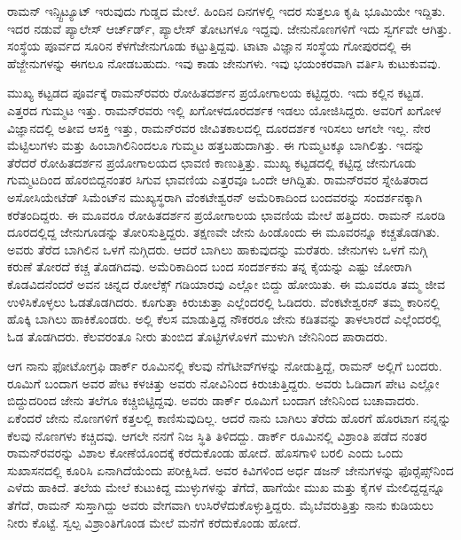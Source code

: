 
ರಾಮನ್ ಇನ್ಸ್ಟಿಟ್ಯೂಟ್ ಇರುವುದು ಗುಡ್ಡದ ಮೇಲೆ. ಹಿಂದಿನ ದಿನಗಳಲ್ಲಿ ಇದರ ಸುತ್ತಲೂ ಕೃಷಿ ಭೂಮಿಯೇ ಇದ್ದಿತು. ಇದರ ನಡುವೆ ಪ್ಯಾಲೇಸ್ ಆರ್ಚ್‌ರ್ಡ್, ಪ್ಯಾಲೇಸ್ ತೋಟಗಳೂ ಇದ್ದವು. ಜೇನುನೊಣಗಳಿಗೆ ಇದು ಸ್ವರ್ಗವೇ ಆಗಿತ್ತು. ಸಂಸ್ಥೆಯ ಪೂರ್ವದ ಸೂರಿನ ಕೆಳಗೆ\break ಜೇನುಗೂಡು ಕಟ್ಟುತ್ತಿದ್ದವು. ಟಾಟಾ ವಿಜ್ಞಾನ ಸಂಸ್ಥೆಯ ಗೋಪುರದಲ್ಲಿ ಈ ಹೆಜ್ಜೇನುಗಳನ್ನು ಈಗಲೂ ನೋಡಬಹುದು. ಇವು ಕಾಡು ಜೇನುಗಳು. ಇವು ಭಯಂಕರವಾಗಿ ವರ್ತಿಸಿ ಕುಟುಕುವವು.

ಮುಖ್ಯ ಕಟ್ಟಡದ ಪೂರ್ವಕ್ಕೆ ರಾಮನ್‍ರವರು ರೋಹಿತದರ್ಶನ ಪ್ರಯೋಗಾಲಯ ಕಟ್ಟಿದ್ದರು. ಇದು ಕಲ್ಲಿನ ಕಟ್ಟಡ. ಎತ್ತರದ ಗುಮ್ಮಟ ಇತ್ತು. ರಾಮನ್‍ರವರು ಇಲ್ಲಿ ಖಗೋಳದೂರದರ್ಶಕ ಇಡಲು ಯೋಜಿಸಿದ್ದರು. ಅವರಿಗೆ ಖಗೋಳ ವಿಜ್ಞಾನದಲ್ಲಿ ಅತೀವ ಆಸಕ್ತಿ ಇತ್ತು, ರಾಮನ್‍ರವರ ಜೀವಿತಕಾಲದಲ್ಲಿ ದೂರದರ್ಶಕ ಇರಿಸಲು ಆಗಲೇ ಇಲ್ಲ. ನೇರ ಮೆಟ್ಟಿಲುಗಳು ಮತ್ತು ಹಿಂಬಾಗಿಲಿನಿಂದಲೂ ಗುಮ್ಮಟ ಹತ್ತಬಹುದಾಗಿತ್ತು. ಈ ಗುಮ್ಮಟಕ್ಕೂ ಬಾಗಿಲಿತ್ತು. ಇದನ್ನು ತೆರೆದರೆ ರೋಹಿತದರ್ಶನ ಪ್ರಯೋಗಾಲಯದ ಛಾವಣಿ ಕಾಣುತ್ತಿತ್ತು. ಮುಖ್ಯ ಕಟ್ಟಡದಲ್ಲಿ ಕಟ್ಟಿದ್ದ ಜೇನುಗೂಡು ಗುಮ್ಮಟದಿಂದ ಹೊರಬಿದ್ದನಂತರ ಸಿಗುವ ಛಾವಣಿಯ ಎತ್ತರವೂ ಒಂದೇ ಆಗಿದ್ದಿತು. ರಾಮನ್‍ರವರ ಸ್ನೇಹಿತರಾದ ಅಸೋಸಿಯೇಟೆಡ್ ಸಿಮೆಂಟ್‍ನ ಮುಖ್ಯಸ್ಥರಾಗಿ ವೆಂಕಟೇಶ್ವರನ್ ಅಮೆರಿಕಾದಿಂದ ಬಂದವರನ್ನು ಸಂದರ್ಶನಕ್ಕಾಗಿ ಕರೆತಂದಿದ್ದರು. ಈ ಮೂವರೂ ರೋಹಿತದರ್ಶನ ಪ್ರಯೋಗಾಲಯ ಛಾವಣಿಯ ಮೇಲೆ ಹತ್ತಿದರು. ರಾಮನ್ ನೂರಡಿ ದೂರದಲ್ಲಿದ್ದ ಜೇನುಗೂಡನ್ನು ತೋರಿಸುತ್ತಿದ್ದರು. ತಕ್ಷಣವೇ ಜೇನು ಹಿಂಡೊಂದು ಈ ಮೂವರನ್ನೂ ಕಚ್ಚತೊಡಗಿತು. ಅವರು ತೆರೆದ ಬಾಗಿಲಿನ ಒಳಗೆ ನುಗ್ಗಿದರು. ಆದರೆ ಬಾಗಿಲು ಹಾಕುವುದನ್ನು ಮರೆತರು. ಜೇನುಗಳು ಒಳಗೆ ನುಗ್ಗಿ ಕರುಣೆ ತೋರದೆ ಕಚ್ಚ ತೊಡಗಿದವು. ಅಮೆರಿಕಾದಿಂದ ಬಂದ ಸಂದರ್ಶಕನು ತನ್ನ ಕೈಯನ್ನು ಎಷ್ಟು ಜೋರಾಗಿ ಕೊಡವಿದನೆಂದರೆ ಅವನ ಚಿನ್ನದ ರೋಲೆಕ್ಸ್ ಗಡಿಯಾರವು ಎಲ್ಲೋ ಬಿದ್ದು ಹೋಯಿತು. ಈ ಮೂವರೂ ತಮ್ಮ ಜೀವ ಉಳಿಸಿಕೊಳ್ಳಲು ಓಡತೊಡಗಿದರು. ಕೂಗುತ್ತಾ ಕಿರುಚುತ್ತಾ ಎಲ್ಲೆಂದರಲ್ಲಿ ಓಡಿದರು. ವೆಂಕಟೇಶ್ವರನ್ ತಮ್ಮ ಕಾರಿನಲ್ಲಿ ಹೊಕ್ಕಿ ಬಾಗಿಲು ಹಾಕಿಕೊಂಡರು. ಅಲ್ಲಿ ಕೆಲಸ ಮಾಡುತ್ತಿದ್ದ ನೌಕರರೂ ಜೇನು ಕಡಿತವನ್ನು ತಾಳಲಾರದೆ ಎಲ್ಲೆಂದರಲ್ಲಿ ಓಡ ತೊಡಗಿದರು. ಕೆಲವರಂತೂ ನೀರು ತುಂಬಿದ ತೊಟ್ಟಿಗಳೊಳಗೆ ಮುಳುಗಿ ಜೇನಿನಿಂದ ಪಾರಾದರು.

ಆಗ ನಾನು ಫೋಟೋಗ್ರಫಿ ಡಾರ್ಕ್ ರೂಮಿನಲ್ಲಿ ಕೆಲವು ನೆಗೆಟೀವ್‍ಗಳನ್ನು ನೋಡುತ್ತಿದ್ದೆ, ರಾಮನ್ ಅಲ್ಲಿಗೆ ಬಂದರು. ರೂಮಿಗೆ ಬಂದಾಗ ಅವರ ಪೇಟ ಕಳಚಿತ್ತು ಅವರು ನೋವಿನಿಂದ ಕಿರುಚುತ್ತಿದ್ದರು. ಅವರು ಓಡಿದಾಗ ಪೇಟ ಎಲ್ಲೋ ಬಿದ್ದುದರಿಂದ ಜೇನು ತಲೆಗೂ ಕಚ್ಚಿಬಿಟ್ಟಿದ್ದವು. ಅವರು ಡಾರ್ಕ್ ರೂಮಿಗೆ ಬಂದಾಗ ಜೇನಿನಿಂದ ಬಚಾವಾದರು. ಏಕೆಂದರೆ ಜೇನು ನೊಣಗಳಿಗೆ ಕತ್ತಲಲ್ಲಿ ಕಾಣಿಸುವುದಿಲ್ಲ. ಆದರೆ ನಾನು ಬಾಗಿಲು ತೆರೆದು ಹೊರಗೆ ಹೊರಟಾಗ ನನ್ನನ್ನು ಕೆಲವು ನೊಣಗಳು ಕಚ್ಚಿದವು. ಆಗಲೇ ನನಗೆ ನಿಜ ಸ್ಥಿತಿ ತಿಳಿದದ್ದು. ಡಾರ್ಕ್ ರೂಮಿನಲ್ಲಿ ವಿಶ್ರಾಂತಿ ಪಡೆದ ನಂತರ ರಾಮನ್‍ರವರನ್ನು ವಿಶಾಲ ಕೋಣೆಯೊಂದಕ್ಕೆ ಕರೆದುಕೊಂಡು ಹೋದೆ. ಹೊಸಗಾಳಿ ಬರಲಿ ಎಂದು ಒಂದು ಸುಖಾಸನದಲ್ಲಿ ಕೂರಿಸಿ ಏನಾಗಿದೆಯೆಂದು ಪರೀಕ್ಷಿಸಿದೆ. ಅವರ ಕಿವಿಗಳಿಂದ ಅರ್ಧ ಡಜನ್ ಜೇನುಗಳನ್ನು ಫೊರ್‍ಸೆಪ್ಸ್‌ನಿಂದ ಎಳೆದು ಹಾಕಿದೆ. ತಲೆಯ ಮೇಲೆ ಕುಟುಕಿದ್ದ ಮುಳ್ಳುಗಳನ್ನು ತೆಗೆದೆ, ಹಾಗೆಯೇ ಮುಖ ಮತ್ತು ಕೈಗಳ ಮೇಲಿದ್ದದ್ದನ್ನೂ ತೆಗೆದೆ, ರಾಮನ್ ಸುಸ್ತಾಗಿದ್ದು ಅವರು ವೇಗವಾಗಿ ಉಸಿರೆಳೆದುಕೊಳ್ಳುತ್ತಿದ್ದರು. ಮೈಬೆವರುತ್ತಿತ್ತು ನಾನು ಕುಡಿಯಲು ನೀರು ಕೊಟ್ಟೆ. ಸ್ವಲ್ಪ ವಿಶ್ರಾಂತಿಗೊಂಡ ಮೇಲೆ ಮನೆಗೆ ಕರೆದುಕೊಂಡು ಹೋದೆ.

